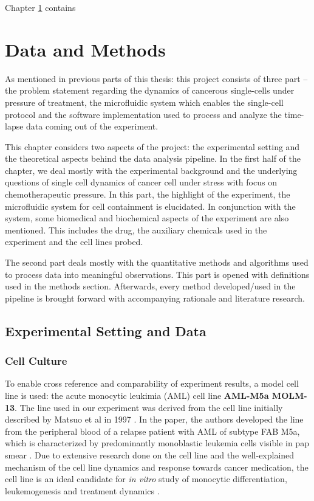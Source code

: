 \documentclass[pdftex,12pt,a4paper]{report}
\begin{document}


Chapter \ref{chapter:data_and_method} contains %

\chapter{Data and Methods}

\label{chapter:data_and_method}

As mentioned in previous parts of this thesis: this project consists of three part -- the problem statement regarding the dynamics of cancerous single-cells under pressure of treatment, the microfluidic system which enables the single-cell protocol and the software implementation used to process and analyze the time-lapse data coming out of the experiment. 

This chapter considers two aspects of the project: the experimental setting and the theoretical aspects behind the data analysis pipeline. In the first half of the chapter, we deal mostly with the experimental background and the underlying questions of single cell dynamics of cancer cell under stress with focus on chemotherapeutic pressure. In this part, the highlight of the experiment, the microfluidic system for cell containment is elucidated. In conjunction with the system, some biomedical and biochemical aspects of the experiment are also mentioned. This includes the drug, the auxiliary chemicals used in the experiment and the cell lines probed.

The second part deals mostly with the quantitative methods and algorithms used to process data into meaningful observations. This part is opened with definitions used in the methods section. Afterwards, every method developed/used in the pipeline is brought forward with accompanying rationale and literature research.

\section{Experimental Setting and Data}

\subsection{Cell Culture}
\label{subsection:cell_culture}

To enable cross reference and comparability of experiment results, a model cell line is used: the acute monocytic leukimia (AML) cell line \textbf{AML-M5a MOLM-13}. The line used in our experiment was derived from the cell line initially described by Matsuo et al in 1997 \cite{matsuo1997two}. In the paper, the authors developed the line from the peripheral blood of a relapse patient with AML of subtype FAB M5a, which is characterized by predominantly monoblastic leukemia cells visible in pap smear \cite{arber20162016}. Due to extensive research done on the cell line and the well-explained mechanism of the cell line dynamics and response towards cancer medication, the cell line is an ideal candidate for \textit{in vitro} study of monocytic differentiation, leukemogenesis and treatment dynamics \cite{matsuo1997two, kelly2002ct53518, yokota1997internal}.
\end{document}
